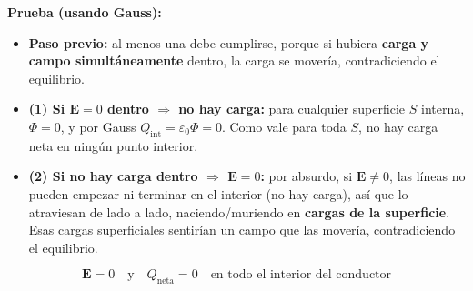 \documentclass[12pt,a4paper]{article}
\begin{document}
\textbf{Prueba (usando Gauss):}

\begin{itemize}[nosep]
  \item \textbf{Paso previo:} al menos una debe cumplirse, porque si
        hubiera \textbf{carga y campo simultáneamente} dentro, la carga
        se movería, contradiciendo el equilibrio.
  \item \textbf{(1) Si $\mathbf{E} = 0$ dentro $\Rightarrow$ no hay
        carga:} para cualquier superficie $S$ interna, $\Phi = 0$, y
        por Gauss $Q_{\text{int}} = \varepsilon_0 \Phi = 0$. Como vale
        para toda $S$, no hay carga neta en ningún punto interior.
  \item \textbf{(2) Si no hay carga dentro $\Rightarrow$
        $\mathbf{E} = 0$:} por absurdo, si $\mathbf{E}\neq 0$, las
        líneas no pueden empezar ni terminar en el interior (no hay
        carga), así que lo atraviesan de lado a lado, naciendo/muriendo
        en \textbf{cargas de la superficie}. Esas cargas superficiales
        sentirían un campo que las movería, contradiciendo el
        equilibrio.
\end{itemize}

\begin{keybox}
  \[
  \boxed{\mathbf{E} = 0 \quad\text{y}\quad Q_{\text{neta}} = 0
         \quad\text{en todo el interior del conductor}}
  \]
\end{keybox}
\end{document}

